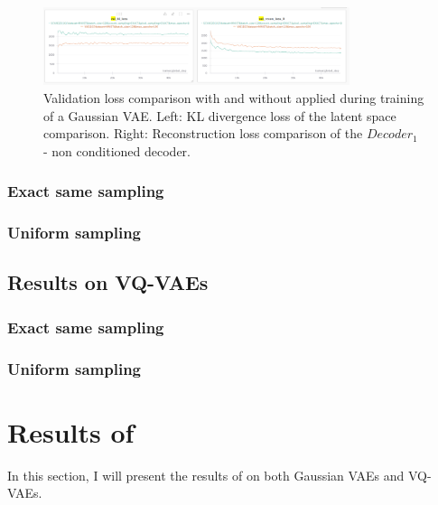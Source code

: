 \begin{figure}[H]
    \centering
    \includegraphics[width=0.8\textwidth]{figures/results/KL_and_RECON.png}
    \caption[Validation loss comparison during training of a Gaussian VAE.]
    {
        Validation loss comparison with and without  applied during training of a Gaussian VAE.
        Left: KL divergence loss of the latent space comparison. Right: Reconstruction loss comparison of the $Decoder_1$ - non conditioned decoder.
    }
    \label{fig:results_method1_gaussian_vae}
\end{figure}







\subsubsection{Exact same sampling}

\subsubsection{Uniform sampling}

\subsection{Results on VQ-VAEs}

\subsubsection{Exact same sampling}

\subsubsection{Uniform sampling}


\section{Results of }

In this section, I will present the results of  on both Gaussian VAEs and VQ-VAEs.

